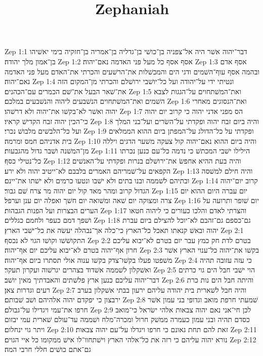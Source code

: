 

\title{Zephaniah}

Zep 1:1  דבר־יהוה אשׁר היה אל־צפניה בן־כושׁי בן־גדליה בן־אמריה בן־חזקיה בימי יאשׁיהו בן־אמון מלך יהודה׃
Zep 1:2  אסף אסף כל מעל פני האדמה נאם־יהוה׃
Zep 1:3  אסף אדם ובהמה אסף עוף־השׁמים ודגי הים והמכשׁלות את־הרשׁעים והכרתי את־האדם מעל פני האדמה נאם־יהוה׃
Zep 1:4  ונטיתי ידי על־יהודה ועל כל־יושׁבי ירושׁלם והכרתי מן־המקום הזה את־שׁאר הבעל את־שׁם הכמרים עם־הכהנים׃
Zep 1:5  ואת־המשׁתחוים על־הגגות לצבא השׁמים ואת־המשׁתחוים הנשׁבעים ליהוה והנשׁבעים במלכם׃
Zep 1:6  ואת־הנסוגים מאחרי יהוה ואשׁר לא־בקשׁו את־יהוה ולא דרשׁהו׃
Zep 1:7  הס מפני אדני יהוה כי קרוב יום יהוה כי־הכין יהוה זבח הקדישׁ קראיו׃
Zep 1:8  והיה ביום זבח יהוה ופקדתי על־השׂרים ועל־בני המלך ועל כל־הלבשׁים מלבושׁ נכרי׃
Zep 1:9  ופקדתי על כל־הדולג על־המפתן ביום ההוא הממלאים בית אדניהם חמס ומרמה׃
Zep 1:10  והיה ביום ההוא נאם־יהוה קול צעקה משׁער הדגים ויללה מן־המשׁנה ושׁבר גדול מהגבעות׃
Zep 1:11  הילילו ישׁבי המכתשׁ כי נדמה כל־עם כנען נכרתו כל־נטילי כסף׃
Zep 1:12  והיה בעת ההיא אחפשׂ את־ירושׁלם בנרות ופקדתי על־האנשׁים הקפאים על־שׁמריהם האמרים בלבבם לא־ייטיב יהוה ולא ירע׃
Zep 1:13  והיה חילם למשׁסה ובתיהם לשׁממה ובנו בתים ולא ישׁבו ונטעו כרמים ולא ישׁתו את־יינם׃
Zep 1:14  קרוב יום־יהוה הגדול קרוב ומהר מאד קול יום יהוה מר צרח שׁם גבור׃
Zep 1:15  יום עברה היום ההוא יום צרה ומצוקה יום שׁאה ומשׁואה יום חשׁך ואפלה יום ענן וערפל׃
Zep 1:16  יום שׁופר ותרועה על הערים הבצרות ועל הפנות הגבהות׃
Zep 1:17  והצרתי לאדם והלכו כעורים כי ליהוה חטאו ושׁפך דמם כעפר ולחמם כגללים׃
Zep 1:18  גם־כספם גם־זהבם לא־יוכל להצילם ביום עברת יהוה ובאשׁ קנאתו תאכל כל־הארץ כי־כלה אך־נבהלה יעשׂה את כל־ישׁבי הארץ׃
Zep 2:1  התקושׁשׁו וקושׁו הגוי לא נכסף׃
Zep 2:2  בטרם לדת חק כמץ עבר יום בטרם לא־יבוא עליכם חרון אף־יהוה בטרם לא־יבוא עליכם יום אף־יהוה׃
Zep 2:3  בקשׁו את־יהוה כל־ענוי הארץ אשׁר משׁפטו פעלו בקשׁו־צדק בקשׁו ענוה אולי תסתרו ביום אף־יהוה׃
Zep 2:4  כי עזה עזובה תהיה ואשׁקלון לשׁממה אשׁדוד בצהרים יגרשׁוה ועקרון תעקר׃
Zep 2:5  הוי ישׁבי חבל הים גוי כרתים דבר־יהוה עליכם כנען ארץ פלשׁתים והאבדתיך מאין יושׁב׃
Zep 2:6  והיתה חבל הים נות כרת רעים וגדרות צאן׃
Zep 2:7  והיה חבל לשׁארית בית יהודה עליהם ירעון בבתי אשׁקלון בערב ירבצון כי יפקדם יהוה אלהיהם ושׁב שׁבותם׃
Zep 2:8  שׁמעתי חרפת מואב וגדופי בני עמון אשׁר חרפו את־עמי ויגדילו על־גבולם׃
Zep 2:9  לכן חי־אני נאם יהוה צבאות אלהי ישׂראל כי־מואב כסדם תהיה ובני עמון כעמרה ממשׁק חרול ומכרה־מלח ושׁממה עד־עולם שׁארית עמי יבזום ויתר גוי ינחלום׃
Zep 2:10  זאת להם תחת גאונם כי חרפו ויגדלו על־עם יהוה צבאות׃
Zep 2:11  נורא יהוה עליהם כי רזה את כל־אלהי הארץ וישׁתחוו־לו אישׁ ממקומו כל איי הגוים׃
Zep 2:12  גם־אתם כושׁים חללי חרבי המה׃
